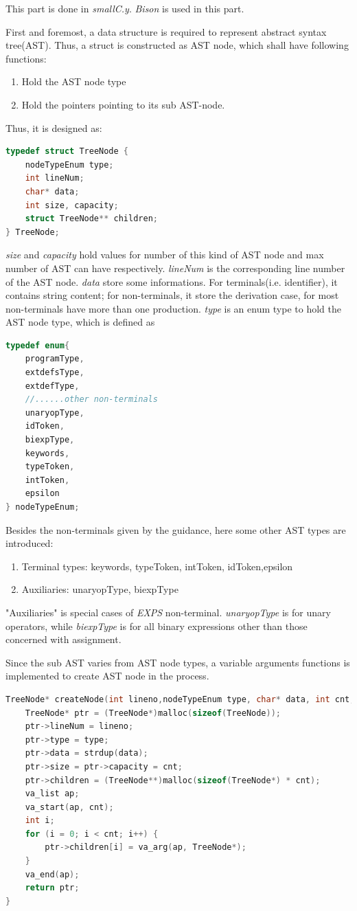 \documentclass{article}
\begin{document}
This part is done in \textit{smallC.y}. \textit{Bison} is used in this part.

First and foremost, a data structure is required to represent abstract syntax tree(AST). Thus, a struct is constructed as AST node, which shall have following functions:
\begin{enumerate}
\item Hold the AST node type
\item Hold the pointers pointing to its sub AST-node.
\end{enumerate}

Thus, it is designed as:

\begin{lstlisting}[language = C] 
typedef struct TreeNode {
    nodeTypeEnum type;
    int lineNum;
    char* data;
    int size, capacity;
    struct TreeNode** children;
} TreeNode;
\end{lstlisting}
\textit{size} and \textit{capacity} hold values for number of this kind of AST node and max number of AST can have respectively. \textit{lineNum} is the corresponding line number of the AST node.
\textit{data} store some informations. For terminals(i.e. identifier), it contains string content; for non-terminals, it store the derivation case, for most non-terminals have more than one production.
\textit{type} is an enum type to hold the AST node type, which is defined as 
\begin{lstlisting}[language = C] 
typedef enum{
	programType,
	extdefsType,
	extdefType,
	//......other non-terminals
	unaryopType,
	idToken,
	biexpType,
	keywords,
	typeToken,
	intToken,
	epsilon
} nodeTypeEnum;
\end{lstlisting}
Besides the non-terminals given by the guidance, here some other AST types are introduced:
\begin{enumerate}
\item
Terminal types: keywords, typeToken, intToken, idToken,epsilon
\item
Auxiliaries: unaryopType, biexpType
\end{enumerate}

"Auxiliaries" is special cases of \textit{EXPS} non-terminal. \textit{unaryopType} is for unary operators, while \textit{biexpType} is for all binary expressions other than those concerned with assignment.

Since the sub AST varies from AST node types, a variable arguments functions is implemented to create AST node in the process.

\begin{lstlisting}[language = C] 
TreeNode* createNode(int lineno,nodeTypeEnum type, char* data, int cnt, ...) {
    TreeNode* ptr = (TreeNode*)malloc(sizeof(TreeNode));
    ptr->lineNum = lineno;
    ptr->type = type;
    ptr->data = strdup(data);
    ptr->size = ptr->capacity = cnt;
    ptr->children = (TreeNode**)malloc(sizeof(TreeNode*) * cnt);
    va_list ap;
    va_start(ap, cnt);
    int i;
    for (i = 0; i < cnt; i++) {
        ptr->children[i] = va_arg(ap, TreeNode*);
    }
    va_end(ap);
    return ptr;
}
\end{lstlisting}
\end{document}
